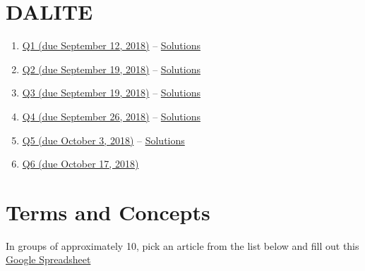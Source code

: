 \documentclass[]{book}
\providecommand{\tightlist}{%
  \setlength{\itemsep}{0pt}\setlength{\parskip}{0pt}}
\providecommand{\tightlist}{%
  \setlength{\itemsep}{0pt}\setlength{\parskip}{0pt}}
\theoremstyle{definition}
\theoremstyle{definition}
\theoremstyle{definition}
\theoremstyle{remark}
\begin{document}
\chapter{DALITE}\label{dalite}

\begin{enumerate}
\def\labelenumi{\arabic{enumi}.}
\tightlist
\item
  \href{https://github.com/sahirbhatnagar/EPIB607/raw/master/dalite/001_hist_mean/001-hist-mean.pdf}{Q1
  (due September 12, 2018)} --
  \href{https://github.com/sahirbhatnagar/EPIB607/raw/master/dalite/001_hist_mean/001-hist-mean-sol.pdf}{Solutions}
\item
  \href{https://github.com/sahirbhatnagar/EPIB607/raw/master/dalite/002_box_sd_curves/002-box-sd-curves.pdf}{Q2
  (due September 19, 2018)} --
  \href{https://github.com/sahirbhatnagar/EPIB607/raw/master/dalite/002_box_sd_curves/002-box-sd-curves-sol.pdf}{Solutions}
\item
  \href{https://github.com/sahirbhatnagar/EPIB607/raw/master/dalite/003_parameters_samplingdist_CLT/003-parameter-samplingdist-CLT.pdf}{Q3
  (due September 19, 2018)} --
  \href{https://github.com/sahirbhatnagar/EPIB607/raw/master/dalite/003_parameters_samplingdist_CLT/003-parameter-samplingdist-CLT-sol.pdf}{Solutions}
\item
  \href{https://github.com/sahirbhatnagar/EPIB607/raw/master/dalite/004_normal_ci/004-normal-ci.pdf}{Q4
  (due September 26, 2018)} --
  \href{https://github.com/sahirbhatnagar/EPIB607/raw/master/dalite/004_normal_ci/004-normal-ci-sol.pdf}{Solutions}
\item
  \href{https://github.com/sahirbhatnagar/EPIB607/raw/master/dalite/005_hypothesis_t/005-hypothesis-t.pdf}{Q5
  (due October 3, 2018)} --
  \href{https://github.com/sahirbhatnagar/EPIB607/raw/master/dalite/005_hypothesis_t/005-hypothesis-t-sol.pdf}{Solutions}
\item
  \href{https://github.com/sahirbhatnagar/EPIB607/raw/master/dalite/006_proportions/006-proportions.pdf}{Q6
  (due October 17, 2018)}
\end{enumerate}

\chapter{Terms and Concepts}\label{terms-and-concepts}

In groups of approximately 10, pick an article from the list below and
fill out this
\href{https://docs.google.com/spreadsheets/d/1Bq10eh3q8aUHuy4VWwBHVud-KAhnm31owKzc0Ie3J24/edit?usp=sharing}{Google
Spreadsheet}
\end{document}
